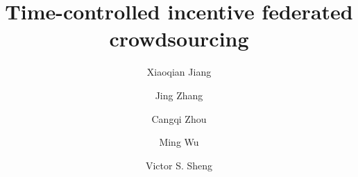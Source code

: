 \documentclass[final,1p,times]{elsarticle}
\begin{document}
	
	\begin{frontmatter}
		
		\title{Time-controlled incentive federated crowdsourcing}
		
		
		\author[mymainaddress]{Xiaoqian Jiang}
		
		\author[mymainaddress]{Jing Zhang
			}
		
		\author[address2]{Cangqi Zhou}
		
		\author[address3]{Ming Wu}
		
		\author[address4]{Victor S. Sheng}
		
		
		\address[mymainaddress]{School of Cyber Science and Engineering, Southeast University, No. 2 SEU Road, Nanjing 211189, China}
		\address[address2]{School of Computer Science and Engineering, Nanjing University of Science and Technology, No. 200 Xiaolingwei Street, Nanjing 210094, China}
		\address[address3]{School of Artificial Intelligence and Automation, Hohai University, No. 8 Fochengxi  Road, Nanjing 211100, China}
		\address[address4]{Department of Computer Science, Texas Tech University, Lubbock, TX 79409, USA}
		

\end{frontmatter}
\end{document}
